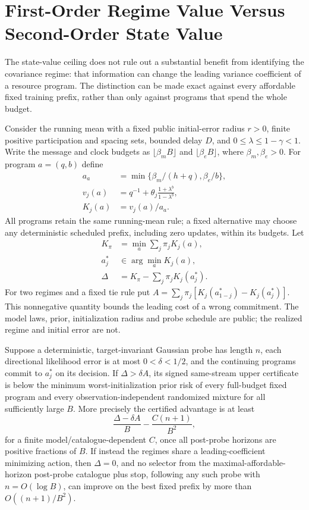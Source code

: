 \section{First-Order Regime Value Versus Second-Order State Value}
The state-value ceiling does not rule out a substantial benefit from identifying
the covariance regime: that information can change the leading variance
coefficient of a resource program.
The distinction can be made exact against every affordable fixed training
prefix, rather than only against programs that spend the whole budget.

Consider the running mean with a fixed public initial-error radius $r>0$,
finite positive participation and spacing sets, bounded delay $D$, and
$0\le\lambda\le1-\gamma<1$.
Write the message and clock budgets as $\lfloor\beta_m B\rfloor$ and
$\lfloor\beta_e B\rfloor$, where $\beta_m,\beta_e>0$.
For program $a=(q,b)$ define
\begin{align*}
a_a&=\min\{\beta_m/(h+q),\beta_e/b\},\\
v_j(a)&=q^{-1}+\theta_j\frac{1+\lambda^b}{1-\lambda^b},\\
K_j(a)&=v_j(a)/a_a.
\end{align*}
All programs retain the same running-mean rule; a fixed alternative may choose
any deterministic scheduled prefix, including zero updates, within its budgets.
Let
\begin{align*}
K_\pi&=\min_a\sum_j\pi_jK_j(a),\\
a_j^*&\in\arg\min_aK_j(a),\\
\Delta&=K_\pi-\sum_j\pi_jK_j(a_j^*).
\end{align*}
For two regimes and a fixed tie rule put
$A=\sum_j\pi_j[K_j(a_{1-j}^*)-K_j(a_j^*)]$.
This nonnegative quantity bounds the leading cost of a wrong commitment.
The model laws, prior, initialization radius and probe schedule are public;
the realized regime and initial error are not.

\begin{theorem}
Suppose a deterministic, target-invariant Gaussian probe has length $n$,
each directional likelihood error is at most $0<\delta<1/2$, and the continuing
programs commit to $a_j^*$ on its decision.
If $\Delta>\delta A$, its signed same-stream upper certificate is below the
minimum worst-initialization prior risk of every full-budget fixed program
and every observation-independent randomized mixture for all sufficiently
large $B$.
More precisely the certified advantage is at least
\[
\frac{\Delta-\delta A}{B}
-\frac{C(n+1)}{B^2},
\]
for a finite model/catalogue-dependent $C$, once all post-probe horizons are
positive fractions of $B$.
If instead the regimes share a leading-coefficient minimizing action, then
$\Delta=0$, and no selector from the maximal-affordable-horizon post-probe
catalogue plus stop, following any such probe with $n=O(\log B)$, can
improve on the best fixed prefix by more than $O((n+1)/B^2)$.
\label{thm:research-leading-separation}
\end{theorem}

